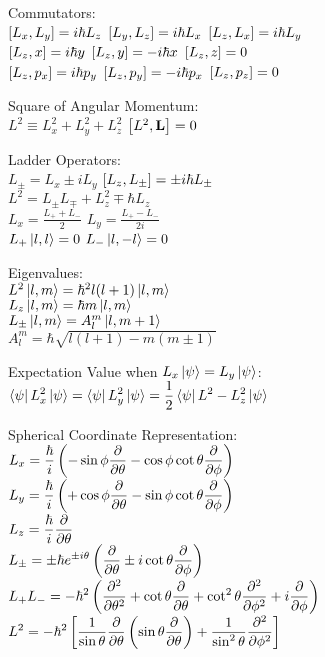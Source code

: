 \documentclass[12pt,landscape]{article}
\newcommand{\tab}{\hspace{.02\textwidth}}
\newcommand{\ds}{\displaystyle}
\begin{document}
\begin{multicols}{3}
Commutators:\\
\tab $\comm{L_x}{L_y} = i\hbar L_z$ \quad $\comm{L_y}{L_z} = i\hbar L_x$ \quad $\comm{L_z}{L_x} = i\hbar L_y$\\
\tab $\comm{L_z}{x} = i\hbar y$ \quad $\comm{L_z}{y} = -i\hbar x$ \quad $\comm{L_z}{z} = 0$\\
\tab $\comm{L_z}{p_x} = i\hbar p_y$ \quad $\comm{L_z}{p_y} = -i\hbar p_x$ \quad $\comm{L_z}{p_z} = 0$

Square of Angular Momentum:\\
\tab $L^2 \equiv L_x^2 + L_y^2 + L_z^2$ \qquad $\comm{L^2}{\vb{L}} = 0$

Ladder Operators:\\
\tab $L_\pm = L_x \pm iL_y$ \qquad $\comm{L_z}{L_\pm} = \pm i\hbar L_\pm$\\
\tab $L^2 = L_\pm L_\mp + L_z^2 \mp \hbar L_z$\\
\tab $\ds L_x = \frac{L_+ + L_-}{2}$ \qquad $\ds L_y = \frac{L_+ - L_-}{2i}$\\
\tab $L_+ \ket{l,l} = 0$ \qquad $L_- \ket{l,-l} =0$

Eigenvalues:\\
\tab $L^2 \ket{l,m} = \hbar^2 l(l+1)\ket{l,m}$\\
\tab $L_z \ket{l,m} = \hbar m \ket{l,m}$\\
\tab $L_\pm \ket{l,m} = A_l^m\ket{l,m+1}$\\
\tab $A_l^m = \hbar \sqrt{l(l+1) - m(m\pm 1)}$

Expectation Value when $L_x\ket{\psi} = L_y\ket{\psi}$:\\
\tab $\ds \bra{\psi}L_x^2\ket{\psi} = \bra{\psi}L_y^2\ket{\psi} = \frac{1}{2}\bra{\psi}L^2 - L_z^2\ket{\psi}$

Spherical Coordinate Representation:\\
\tab $L_x = \ds \frac{\hbar}{i}\left(-\sin\phi \pdv{\theta} - \cos\phi\cot\theta\pdv{\phi}\right)$\\
\tab $L_y = \ds \frac{\hbar}{i}\left(+\cos\phi \pdv{\theta} - \sin\phi\cot\theta\pdv{\phi}\right)$\\
\tab $\ds L_z = \frac{\hbar}{i}\pdv{\theta}$\\
\tab $\ds L_\pm = \pm\hbar e^{\pm i \theta}\left(\pdv{\theta} \pm i\cot\theta\pdv{\phi}\right)$\\
\tab $\ds L_+L_- = -\hbar^2\left(\pdv[2]{\theta}+\cot\theta\pdv{\theta} + \cot^2\theta\pdv[2]{\phi} + i\pdv{\phi}\right)$\\
\tab $\ds L^2 = -\hbar^2\left[\frac{1}{\sin\theta}\pdv{\theta}\left(\sin\theta\pdv{\theta}\right) + \frac{1}{\sin^2\theta}\pdv[2]{\phi}\right]$



\end{multicols}
\end{document}

